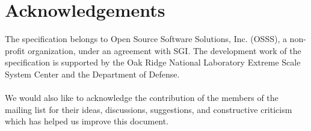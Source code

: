 \date{\today}

\section*{Acknowledgements}
The \openshmem specification belongs to Open Source Software Solutions, Inc. (OSSS), a non-profit organization, under an agreement with SGI. The development work of the specification is supported by the Oak Ridge National Laboratory Extreme Scale System Center and the Department of Defense.\\
\\
We would also like to acknowledge the contribution of the members of the \openshmem mailing list for their ideas, discussions, suggestions, and constructive criticism which has helped us improve this document.


%
%

{\large \pagebreak{}}
